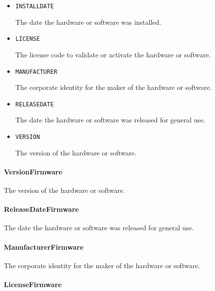 \begin{itemize}

\item \texttt{INSTALL\textunderscore DATE}


The date the hardware or software was installed.

\item \texttt{LICENSE}


The license code to validate or activate the hardware or software.

\item \texttt{MANUFACTURER}


The corporate identity for the maker of the hardware or software.


\item \texttt{RELEASE\textunderscore DATE}


The date the hardware or software was released for general use.


\item \texttt{VERSION}


The version of the hardware or software.


\end{itemize}

\paragraph{VersionFirmware}\mbox{}
\label{sec:VersionFirmware}


The version of the hardware or software.


\paragraph{ReleaseDateFirmware}\mbox{}
\label{sec:ReleaseDateFirmware}


The date the hardware or software was released for general use.



\paragraph{ManufacturerFirmware}\mbox{}
\label{sec:ManufacturerFirmware}


The corporate identity for the maker of the hardware or software.



\paragraph{LicenseFirmware}\mbox{}
\label{sec:LicenseFirmware}


